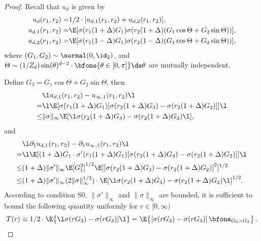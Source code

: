 \documentclass[11pt]{article}
\begin{document}
\begin{proof}
Recall that $u_d$ is given by
\[
\begin{aligned}
u_d(r_1, r_2) =& 1/2 \cdot [u_{d, 1}(r_1, r_2) + u_{d, 2}(r_1, r_2)], \\
u_{d, 1}(r_1, r_2) =& \E[\sigma(r_1 (1 + \Delta) G_1) \sigma(r_2 (1 + \Delta) (G_1\cos\Theta + G_2 \sin\Theta))],\\
u_{d, 2}(r_1, r_2) =& \E[\sigma(r_1 (1 - \Delta) G_1) \sigma(r_2 (1 - \Delta) (G_1 \cos\Theta + G_2 \sin \Theta ))],
\end{aligned}
\]
where $(G_1, G_2) \sim \normal(0, \id_2)$, and $\Theta \sim (1/Z_d) \sin(\theta)^{d-2} \cdot \bfone\{ \theta \in [0, \pi] \} \de \theta$ are mutually independent. 

Define $G_3 = G_1 \cos \Theta + G_2 \sin \Theta$, then
\begin{equation}
\begin{aligned}
& \l u_{d, 1}(r_1, r_2) -  u_{\infty, 1}(r_1, r_2) \l \\
=& \l \E[\sigma(r_1 (1 + \Delta) G_1) [\sigma(r_2 (1 + \Delta) G_3) - \sigma(r_2 (1 + \Delta) G_2)]] \l\\
\le& \| \sigma\|_\infty \E[\l \sigma(r_2 (1 + \Delta) G_3) - \sigma(r_2 (1 + \Delta) G_2)\l ],
\end{aligned}
\end{equation}
and
\begin{equation}
\begin{aligned}
& \l \partial_1 u_{d, 1}(r_1, r_2) - \partial_1 u_{\infty, 1}(r_1, r_2) \l \\
=& \l \E[(1 + \Delta) G_1 \cdot \sigma'(r_1 (1 + \Delta) G_1) [\sigma(r_2 (1 + \Delta) G_3) - \sigma(r_2 (1 + \Delta) G_2)]] \l\\
\le& (1 + \Delta) \| \sigma' \|_\infty \E[G_1^2]^{1/2} \E[[\sigma(r_2 (1 + \Delta) G_3) - \sigma(r_2 (1 + \Delta) G_2)]^2]^{1/2}\\
\le& (1 + \Delta) \| \sigma' \|_\infty  (2 \| \sigma \|_\infty^{1/2}) \cdot \E[\l \sigma(r_2 (1 + \Delta) G_3) - \sigma(r_2 (1 + \Delta) G_2)\l ]^{1/2}.
\end{aligned}
\end{equation}
According to condition {\sf S0}, $\| \sigma'\|_\infty$ and $\| \sigma \|_\infty$ are bounded, it is sufficient to bound the following quantity uniformly for $r \in [0, \infty)$
\begin{equation}
T(r) \equiv 1/2 \cdot \E\big\{ \l \sigma(r G_2) - \sigma(r G_3)] \l \}= \E\big\{ [ \sigma(r G_2) - \sigma(r G_3)]\, \bfone_{G_2>G_3}\big\}\, .
\end{equation}


\end{proof}
\end{document}
